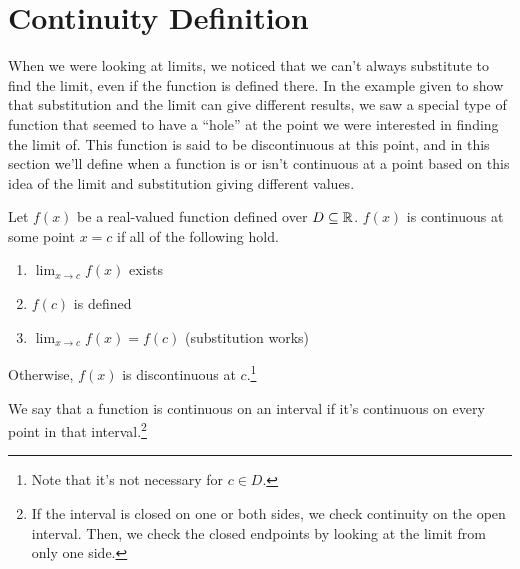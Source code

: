 \section{Continuity Definition}
When we were looking at limits, we noticed that we can't always substitute to find the limit, even if the function is defined there.
In the example given to show that substitution and the limit can give different results, we saw a special type of function that seemed to have a ``hole'' at the point we were interested in finding the limit of.
This function is said to be discontinuous at this point, and in this section we'll define when a function is or isn't continuous at a point based on this idea of the limit and substitution giving different values.

\begin{definition}
	Let $f(x)$ be a real-valued function defined over $D \subseteq \mathbb{R}$.
	$f(x)$ is continuous at some point $x = c$ if all of the following hold.
	\begin{enumerate}
		\item $\lim_{x \to c}{f(x)}$ exists
		\item $f(c)$ is defined
		\item $\lim_{x \to c}{f(x)} = f(c)$ (substitution works)
	\end{enumerate}
	Otherwise, $f(x)$ is discontinuous at $c$.\footnote{Note that it's not necessary for $c \in D$.}
\end{definition}


We say that a function is continuous on an interval if it's continuous on every point in that interval.\footnote{If the interval is closed on one or both sides, we check continuity on the open interval. Then, we check the closed endpoints by looking at the limit from only one side.}

